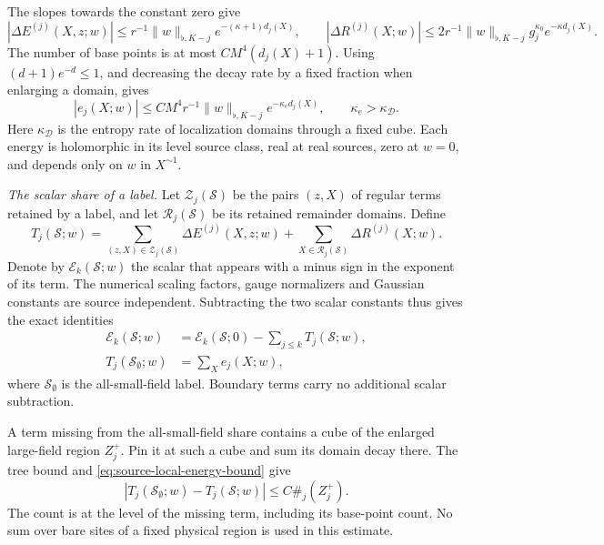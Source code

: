 \documentclass[11pt,letterpaper,reqno]{amsart}
\theoremstyle{definition}
\theoremstyle{remark}
\begin{document}
The slopes towards the constant zero give
\[
 |\Delta E^{(j)}(X,z;w)|
 \le r^{-1}\|w\|_{\flat,K-j}e^{-(\kappa+1)d_j(X)},\qquad
 |\Delta R^{(j)}(X;w)|
 \le2r^{-1}\|w\|_{\flat,K-j}g_j^{\kappa_0}e^{-\kappa d_j(X)}.
\]
The number of base points is at most $CM^4(d_j(X)+1)$.
Using $(d+1)e^{-d}\le1$, and decreasing the decay rate by a fixed
fraction when enlarging a domain, gives
\begin{equation}\label{eq:source-local-energy-bound}
 |e_j(X;w)|\le CM^4r^{-1}\|w\|_{\flat,K-j}
                       e^{-\kappa_e d_j(X)},\qquad
 \kappa_e>\kappa_{\mathcal D}.
\end{equation}
Here $\kappa_{\mathcal D}$ is the entropy rate of localization
domains through a fixed cube. Each energy is holomorphic in its
level source class, real at real sources, zero at $w=0$, and
depends only on $w$ in $X^{\sim1}$.

\emph{The scalar share of a label.}
Let $\mathcal Z_j(\mathcal S)$ be the pairs $(z,X)$ of regular
terms retained by a label, and let $\mathcal R_j(\mathcal S)$
be its retained remainder domains. Define
\[
 T_j(\mathcal S;w)=
 \sum_{(z,X)\in\mathcal Z_j(\mathcal S)}
                       \Delta E^{(j)}(X,z;w)
 +\sum_{X\in\mathcal R_j(\mathcal S)}\Delta R^{(j)}(X;w).
\]
Denote by $\mathcal E_k(\mathcal S;w)$ the scalar that appears
with a minus sign in the exponent of its term. The numerical
scaling factors, gauge normalizers and Gaussian constants are
source independent. Subtracting the two scalar constants thus
gives the exact identities
\begin{equation}\label{eq:source-label-share}
 \begin{split}
 \mathcal E_k(\mathcal S;w)
    &=\mathcal E_k(\mathcal S;0)-\sum_{j\le k}T_j(\mathcal S;w),\\
 T_j(\mathcal S_\emptyset;w)&=\sum_Xe_j(X;w),
 \end{split}
\end{equation}
where $\mathcal S_\emptyset$ is the all-small-field label.
Boundary terms carry no additional scalar subtraction.

A term missing from the all-small-field share contains a cube of
the enlarged large-field region $Z_j^+$. Pin it at such a cube
and sum its domain decay there. The tree bound and
\eqref{eq:source-local-energy-bound} give
\begin{equation}\label{eq:source-missing-share}
 |T_j(\mathcal S_\emptyset;w)-T_j(\mathcal S;w)|
                                      \le C\#_j(Z_j^+).
\end{equation}
The count is at the level of the missing term, including its
base-point count. No sum over bare sites of a fixed physical
region is used in this estimate.
\end{document}
